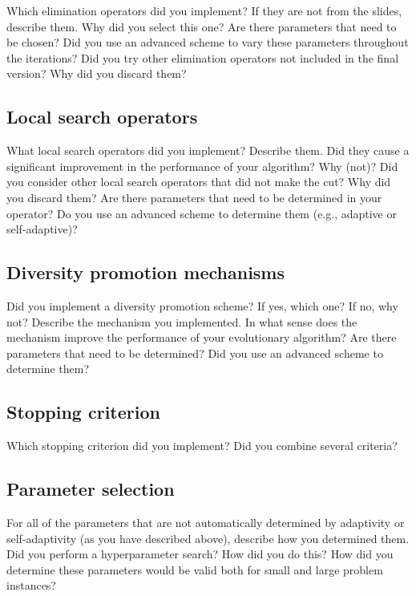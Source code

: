 \documentclass[a4paper,10pt]{article}
\newcommand{\ReplaceMe}[1]{{\color{blue}#1}}
\begin{document}
\ReplaceMe{Which elimination operators did you implement? If they are not from the slides, describe them. Why did you select this one? Are there parameters that need to be chosen? Did you use an advanced scheme to vary these parameters throughout the iterations? Did you try other elimination operators not included in the final version? Why did you discard them?} 

\subsection{Local search operators}

\ReplaceMe{What local search operators did you implement? Describe them. Did they cause a significant improvement in the performance of your algorithm? Why (not)? Did you consider other local search operators that did not make the cut? Why did you discard them? Are there parameters that need to be determined in your operator? Do you use an advanced scheme to determine them (e.g., adaptive or self-adaptive)?}

\subsection{Diversity promotion mechanisms}

\ReplaceMe{Did you implement a diversity promotion scheme? If yes, which one? If no, why not? Describe the mechanism you implemented. In what sense does the mechanism improve the performance of your evolutionary algorithm? Are there parameters that need to be determined? Did you use an advanced scheme to determine them?}

\subsection{Stopping criterion}

\ReplaceMe{Which stopping criterion did you implement? Did you combine several criteria?}

\subsection{Parameter selection}

\ReplaceMe{For all of the parameters that are not automatically determined by adaptivity or self-adaptivity (as you have described above), describe how you determined them. Did you perform a hyperparameter search? How did you do this? How did you determine these parameters would be valid both for small and large problem instances?}
\end{document}
